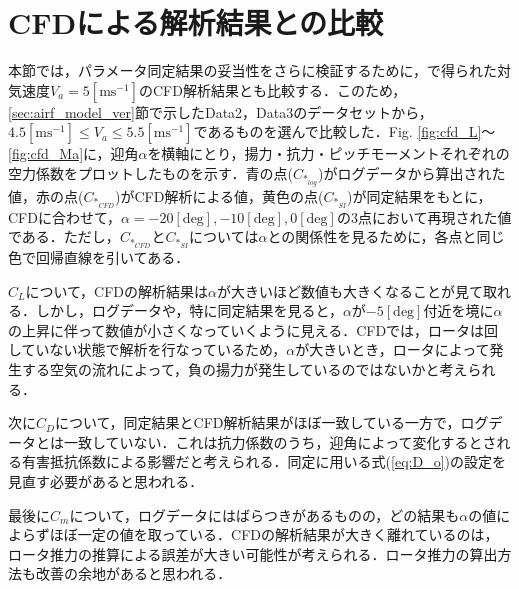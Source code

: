 \section{CFDによる解析結果との比較}
\label{sec:cfd}

本節では，パラメータ同定結果の妥当性をさらに検証するために，\cite{kawano}で得られた対気速度$V_a=5\mathrm{[m s^{-1}]}$のCFD解析結果とも比較する．このため，\ref{sec:airf_model_ver}節で示したData2，Data3のデータセットから，$4.5\mathrm{[m s^{-1}]} \leq V_a \leq 5.5\mathrm{[m s^{-1}]}$であるものを選んで比較した．Fig. \ref{fig:cfd_L}〜\ref{fig:cfd_Ma}に，迎角$\alpha$を横軸にとり，揚力・抗力・ピッチモーメントそれぞれの空力係数をプロットしたものを示す．青の点($C_{*_{log}}$)がログデータから算出された値，赤の点($C_{*_{CFD}}$)がCFD解析による値，黄色の点($C_{*_{SI}}$)が同定結果をもとに，CFDに合わせて，$\alpha=-20\mathrm{[deg]},-10\mathrm{[deg]},0\mathrm{[deg]}$の3点において再現された値である．ただし，$C_{*_{CFD}}$と$C_{*_{SI}}$については$\alpha$との関係性を見るために，各点と同じ色で回帰直線を引いてある．

$C_L$について，CFDの解析結果は$\alpha$が大きいほど数値も大きくなることが見て取れる．しかし，ログデータや，特に同定結果を見ると，$\alpha$が$-5\mathrm{[deg]}$付近を境に$\alpha$の上昇に伴って数値が小さくなっていくように見える．CFDでは，ロータは回していない状態で解析を行なっているため，$\alpha$が大きいとき，ロータによって発生する空気の流れによって，負の揚力が発生しているのではないかと考えられる．

次に$C_D$について，同定結果とCFD解析結果がほぼ一致している一方で，ログデータとは一致していない．これは抗力係数のうち，迎角によって変化するとされる有害抵抗係数による影響だと考えられる\cite{katou}．同定に用いる式(\ref{eq:D_o})の設定を見直す必要があると思われる．

最後に$C_m$について，ログデータにはばらつきがあるものの，どの結果も$\alpha$の値によらずほぼ一定の値を取っている．CFDの解析結果が大きく離れているのは，ロータ推力の推算による誤差が大きい可能性が考えられる．ロータ推力の算出方法も改善の余地があると思われる．

